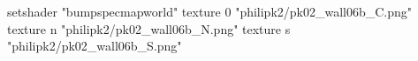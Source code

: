 setshader "bumpspecmapworld"
    texture 0 "philipk2/pk02_wall06b_C.png"
    texture n "philipk2/pk02_wall06b_N.png"
    texture s "philipk2/pk02_wall06b_S.png"